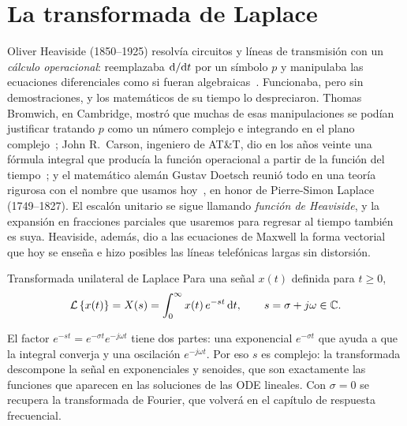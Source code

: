 \section{La transformada de Laplace}
\label{sec:po-laplace}

\begin{historia}
Oliver Heaviside (1850--1925) resolvía circuitos y líneas de transmisión con un \emph{cálculo operacional}: reemplazaba $\mathrm{d}/\mathrm{d} t$ por un símbolo $p$ y manipulaba las ecuaciones diferenciales como si fueran algebraicas~\citep{Mah17}. Funcionaba, pero sin demostraciones, y los matemáticos de su tiempo lo despreciaron. Thomas Bromwich, en Cambridge, mostró que muchas de esas manipulaciones se podían justificar tratando $p$ como un número complejo e integrando en el plano complejo~\citep{Bro17}; John R.\ Carson, ingeniero de AT\&T, dio en los años veinte una fórmula integral que producía la función operacional a partir de la función del tiempo~\citep{Car26}; y el matemático alemán Gustav Doetsch reunió todo en una teoría rigurosa con el nombre que usamos hoy~\citep{Doe37}, en honor de Pierre-Simon Laplace (1749--1827). El escalón unitario se sigue llamando \emph{función de Heaviside}, y la expansión en fracciones parciales que usaremos para regresar al tiempo también es suya. Heaviside, además, dio a las ecuaciones de Maxwell la forma vectorial que hoy se enseña e hizo posibles las líneas telefónicas largas sin distorsión.
\end{historia}

\begin{definicion}[label=def:po-laplace]{Transformada unilateral de Laplace}
Para una señal $x(t)$ definida para $t\geq0$,
\begin{equation}
  \mathcal{L}\left\{x(t)\right\}=X(s)=\int_0^\infty x(t)\,e^{-st}\,\mathrm{d} t,\qquad s=\sigma+j\omega\in\mathbb{C}.
  \label{eq:po-laplace}
\end{equation}
\end{definicion}

El factor $e^{-st}=e^{-\sigma t}e^{-j\omega t}$ tiene dos partes: una exponencial $e^{-\sigma t}$ que ayuda a que la integral converja y una oscilación $e^{-j\omega t}$. Por eso $s$ es complejo: la transformada descompone la señal en exponenciales y senoides, que son exactamente las funciones que aparecen en las soluciones de las ODE lineales. Con $\sigma=0$ se recupera la transformada de Fourier, que volverá en el capítulo de respuesta frecuencial.

